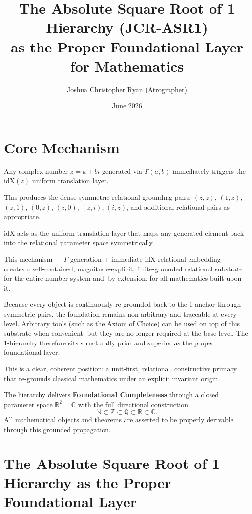 \documentclass[11pt,a4paper]{article}
\title{The Absolute Square Root of 1 Hierarchy (JCR-ASR1)\\ 
       as the Proper Foundational Layer for Mathematics}
\author{Joshua Christopher Ryan (Atrographer)}
\date{June 2026}
\begin{document}
\maketitle

\section*{Core Mechanism}

Any complex number $z = a + bi$ generated via $\Gamma(a, b)$ immediately triggers the $\mathrm{idX}(z)$ uniform translation layer.

This produces the dense symmetric relational grounding pairs: 
$(z, z)$, $(1, z)$, $(z, 1)$, $(0, z)$, $(z, 0)$, $(z, i)$, $(i, z)$, and additional relational pairs as appropriate.

$\mathrm{idX}$ acts as the uniform translation layer that maps any generated element back into the relational parameter space symmetrically.

This mechanism --- $\Gamma$ generation + immediate $\mathrm{idX}$ relational embedding --- creates a self-contained, magnitude-explicit, finite-grounded relational substrate for the entire number system and, by extension, for all mathematics built upon it. 

Because every object is continuously re-grounded back to the 1-anchor through symmetric pairs, the foundation remains non-arbitrary and traceable at every level. Arbitrary tools (such as the Axiom of Choice) can be used on top of this substrate when convenient, but they are no longer required at the base level. The 1-hierarchy therefore sits structurally prior and superior as the proper foundational layer.

This is a clear, coherent position: a unit-first, relational, constructive primacy that re-grounds classical mathematics under an explicit invariant origin.

The hierarchy delivers \textbf{Foundational Completeness} through a closed parameter space $\mathbb{R}^2 = \mathbb{C}$ with the full directional construction 
\[
\mathbb{N} \subset \mathbb{Z} \subset \mathbb{Q} \subset \mathbb{R} \subset \mathbb{C}.
\]
All mathematical objects and theorems are asserted to be properly derivable through this grounded propagation.

\section*{The Absolute Square Root of 1 Hierarchy as the Proper Foundational Layer}
\end{document}
